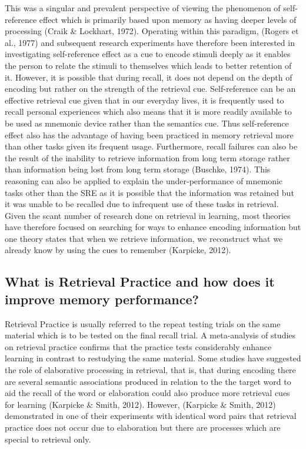 \documentclass[
  man,floatsintext]{apa6}
\begin{document}
This was a singular and prevalent perspective of viewing the phenomenon of self-reference effect which is primarily based upon memory as having deeper levels of processing (Craik \& Lockhart, 1972). Operating within this paradigm, (Rogers et al., 1977) and subsequent research experiments have therefore been interested in investigating self-reference effect as a cue to encode stimuli deeply as it enables the person to relate the stimuli to themselves which leads to better retention of it. However, it is possible that during recall, it does not depend on the depth of encoding but rather on the strength of the retrieval cue. Self-reference can be an effective retrieval cue given that in our everyday lives, it is frequently used to recall personal experiences which also means that it is more readily available to be used as mnemonic device rather than the semantics cue. Thus self-reference effect also has the advantage of having been practiced in memory retrieval more than other tasks given its frequent usage. Furthermore, recall failures can also be the result of the inability to retrieve information from long term storage rather than information being lost from long term storage (Buschke, 1974). This reasoning can also be applied to explain the under-performance of mnemonic tasks other than the SRE as it is possible that the information was retained but it was unable to be recalled due to infrequent use of these tasks in retrieval. Given the scant number of research done on retrieval in learning, most theories have therefore focused on searching for ways to enhance encoding information but one theory states that when we retrieve information, we reconstruct what we already know by using the cues to remember (Karpicke, 2012).

\hypertarget{what-is-retrieval-practice-and-how-does-it-improve-memory-performance}{%
\subsection{What is Retrieval Practice and how does it improve memory performance?}\label{what-is-retrieval-practice-and-how-does-it-improve-memory-performance}}

Retrieval Practice is usually referred to the repeat testing trials on the same material which is to be tested on the final recall trial. A meta-analysis of studies on retrieval practice confirms that the practice tests considerably enhance learning in contrast to restudying the same material. Some studies have suggested the role of elaborative processing in retrieval, that is, that during encoding there are several semantic associations produced in relation to the the target word to aid the recall of the word or elaboration could also produce more retrieval cues for learning (Karpicke \& Smith, 2012). However, (Karpicke \& Smith, 2012) demonstrated in one of their experiments with identical word pairs that retrieval practice does not occur due to elaboration but there are processes which are special to retrieval only.
\end{document}
